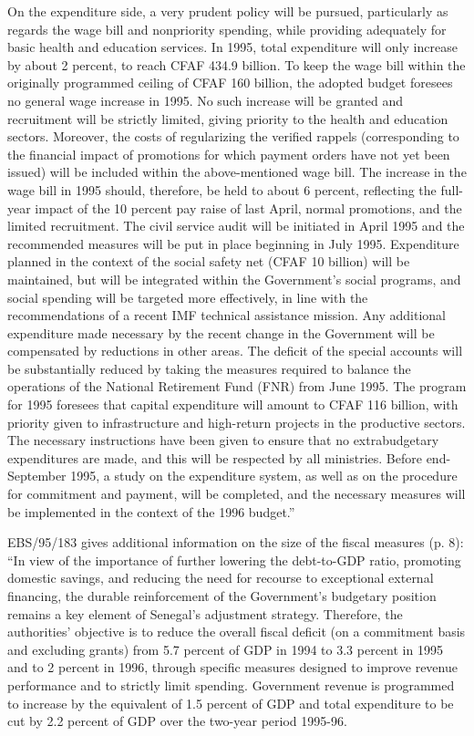 On the expenditure side, a very prudent policy will be pursued, particularly as regards the wage bill and nonpriority spending, while providing adequately for basic health and education services. In 1995, total expenditure will only increase by about 2 percent, to reach CFAF 434.9 billion. To keep the wage bill within the originally programmed ceiling of CFAF 160 billion, the adopted budget foresees no general wage increase in 1995. No such increase will be granted and recruitment will be strictly limited, giving priority to the health and education sectors. Moreover, the costs of regularizing the verified rappels (corresponding to the financial impact of promotions for which payment orders have not yet been issued) will be included within the above-mentioned wage bill. The increase in the wage bill in 1995 should, therefore, be held to about 6 percent, reflecting the full-year impact of the 10 percent pay raise of last April, normal promotions, and the limited recruitment. The civil service audit will be initiated in April 1995 and the recommended measures will be put in place beginning in July 1995. Expenditure planned in the context of the social safety net (CFAF 10 billion) will be maintained, but will be integrated within the Government's social programs, and social spending will be targeted more effectively, in line with the recommendations of a recent IMF technical assistance mission. Any additional expenditure made necessary by the recent change in the Government will be compensated by reductions in other areas. The deficit of the special accounts will be substantially reduced by taking the measures required to balance the operations of the National Retirement Fund (FNR) from June 1995. The program for 1995 foresees that capital expenditure will amount to CFAF 116 billion, with priority given to infrastructure and high-return projects in the productive sectors. The necessary instructions have been given to ensure that no extrabudgetary expenditures are made, and this will be respected by all ministries. Before end-September 1995, a study on the expenditure system, as well as on the procedure for commitment and payment, will be completed, and the necessary measures will be implemented in the context of the 1996 budget.”

EBS/95/183 gives additional information on the size of the fiscal measures (p. 8): “In view of the importance of further lowering the debt-to-GDP ratio, promoting domestic savings, and reducing the need for recourse to exceptional external financing, the durable reinforcement of the Government’s budgetary position remains a key element of Senegal’s adjustment strategy. Therefore, the authorities’ objective is to reduce the overall fiscal deficit (on a commitment basis and excluding grants) from 5.7 percent of GDP in 1994 to 3.3 percent in 1995 and to 2 percent in 1996, through specific measures designed to improve revenue performance and to strictly limit spending. Government revenue is programmed to increase by the equivalent of 1.5 percent of GDP and total expenditure to be cut by 2.2 percent of GDP over the two-year period 1995-96.\\

